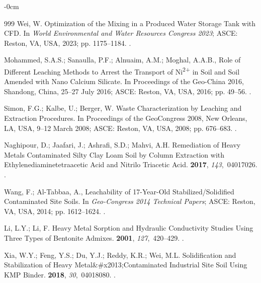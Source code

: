 \documentclass[algorithms,article,accept,pdftex,moreauthors]{Definitions/mdpi}
\begin{document}
\begin{adjustwidth}{-\extralength}{0cm}
\begin{thebibliography}{999}
Wei, W. Optimization of the Mixing in a Produced Water Storage Tank with CFD.
\newblock In {\em World Environmental and Water Resources Congress 2023}; ASCE:
 Reston, VA, USA, 2023; pp. 1175--1184. %
.

Mohammed, S.A.S.; Sanaulla, P.F.; Alnuaim, A.M.; Moghal, A.A.B., Role of
  Different Leaching Methods to Arrest the Transport of Ni\textsuperscript{2+} in Soil
  and Soil Amended with Nano Calcium Silicate.
\newblock In Proceedings of the  Geo-China 2016, Shandong, China, 25--27 July 2016; ASCE: Reston, VA, USA, 2016; pp. 49--56. %
.

Simon, F.G.; Kalbe, U.; Berger, W. Waste Characterization by Leaching and
  Extraction Procedures.
\newblock In Proceedings of the GeoCongress 2008, New Orleans, LA, USA, 9--12 March 2008; ASCE: Reston, VA, USA, 2008; pp. 676--683. %
.

Naghipour, D.; Jaafari, J.; Ashrafi, S.D.; Mahvi, A.H.
\newblock Remediation of Heavy Metals Contaminated Silty Clay Loam Soil by
  Column Extraction with Ethylenediaminetetraacetic Acid and Nitrilo Triacetic
  Acid.
 {\bf 2017}, {\em
  143},~04017026.
.

Wang, F.; Al-Tabbaa, A., Leachability of 17-Year-Old Stabilized/Solidified
  Contaminated Site Soils.
\newblock In {\em Geo-Congress 2014 Technical Papers}; ASCE: Reston, VA, USA, 2014; pp. %
  1612--1624.
.

Li, L.Y.; Li, F.
\newblock Heavy Metal Sorption and Hydraulic Conductivity Studies Using Three
  Types of Bentonite Admixes.
 {\bf 2001}, {\em
  127},~420--429.
.

Xia, W.Y.; Feng, Y.S.; Du, Y.J.; Reddy, K.R.; Wei, M.L.
\newblock Solidification and Stabilization of Heavy Metal\&\#x2013;Contaminated
  Industrial Site Soil Using KMP Binder.
 {\bf 2018}, {\em
  30},~04018080.
.


\end{thebibliography}
\end{adjustwidth}
\end{document}
